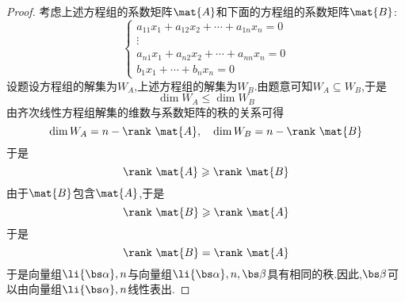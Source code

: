 \documentclass{ctexart}
\begin{document}
\begin{proof}
    考虑上述方程组的系数矩阵$\mat{A}$和下面的方程组的系数矩阵$\mat{B}$:
    \[\left\{\begin{array}{c}
        a_{11}x_1+a_{12}x_2+\cdots+a_{1n}x_n=0\\
        \vdots\\
        a_{n1}x_1+a_{n2}x_2+\cdots+a_{nn}x_n=0\\
        b_1x_1+\cdots+b_nx_n=0
    \end{array}\right.\]
    设题设方程组的解集为$W_A$,上述方程组的解集为$W_B$.由题意可知$W_A\subseteq W_B$,于是
    \[\dim W_A\leqslant\dim W_B\]
    由齐次线性方程组解集的维数与系数矩阵的秩的关系可得
    \[\dim W_A=n-\rank\ \mat{A},\quad\dim W_B=n-\rank\ \mat{B}\]
    于是
    \[\rank\ \mat{A}\geqslant\rank\ \mat{B}\]
    由于$\mat{B}$包含$\mat{A}$,于是
    \[\rank\ \mat{B}\geqslant\rank\ \mat{A}\]
    于是
    \[\rank\ \mat{B}=\rank\ \mat{A}\]
    于是向量组$\li{\bs\alpha},n$与向量组$\li{\bs\alpha},n,\bs\beta$具有相同的秩.因此,$\bs\beta$可以由向量组$\li{\bs\alpha},n$线性表出.
\end{proof}
\end{document}
